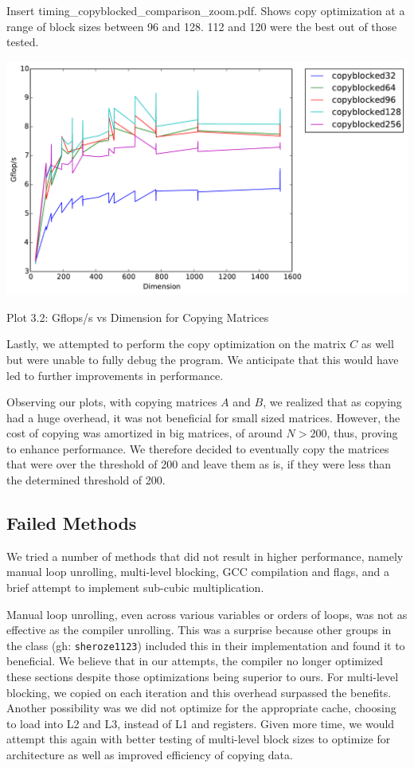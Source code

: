 \documentclass[12pt]{article}
\begin{document}
Insert timing\_copyblocked\_comparison\_zoom.pdf. Shows copy optimization at a range of block sizes between 96 and 128. 112 and 120 were the best out of those tested.

\begin{center}
\includegraphics[width=16cm]{timing_copyblocked_comparison.pdf}

Plot 3.2: Gflops/s vs Dimension for Copying Matrices
\end{center}

Lastly, we attempted to perform the copy optimization on the matrix $C$ as well but were unable to fully debug the program. We anticipate that this would have led to further improvements in performance.

Observing our plots, with copying matrices $A$ and $B$, we realized that as copying had a huge overhead, it was not beneficial for small sized matrices. However, the cost of copying was amortized in big matrices, of around $N>200$, thus, proving to enhance performance. We therefore decided to eventually copy the matrices that were over the threshold of 200 and leave them as is, if they were less than the determined threshold of 200.

\subsection{Failed Methods}
We tried a number of methods that did not result in higher performance, namely manual loop unrolling, multi-level blocking, GCC compilation and flags, and a brief attempt to implement sub-cubic multiplication. 

Manual loop unrolling, even across various variables or orders of loops, was not as effective as the compiler unrolling. This was a surprise because other groups in the class (gh: \texttt{sheroze1123}) included this in their implementation and found it to beneficial.  We believe that in our attempts, the compiler no longer optimized these sections despite those optimizations being superior to ours. For multi-level blocking, we copied on each iteration and this overhead surpassed the benefits. Another possibility was we did not optimize for the appropriate cache, choosing to load into L2 and L3, instead of L1 and registers. Given more time, we would attempt this again with better testing of multi-level block sizes to optimize for architecture as well as improved efficiency of copying data. 
\end{document}
